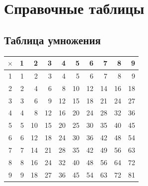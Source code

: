 \chapter*{Справочные таблицы}

\section*{Таблица умножения}

\begingroup\renewcommand{\arraystretch}{1.25}\setlength{\tabcolsep}{6pt}

\begin{center}\begin{tabular}{|c|r|r|r|r|r|r|r|r|r|}\hline

\(\times\)&1&2&3&4&5&6&7&8&9\\\hline

1&1&2&3&4&5&6&7&8&9\\\hline

2&2&4&6&8&10&12&14&16&18\\\hline

3&3&6&9&12&15&18&21&24&27\\\hline

4&4&8&12&16&20&24&28&32&36\\\hline

5&5&10&15&20&25&30&35&40&45\\\hline

6&6&12&18&24&30&36&42&48&54\\\hline

7&7&14&21&28&35&42&49&56&63\\\hline

8&8&16&24&32&40&48&56&64&72\\\hline

9&9&18&27&36&45&54&63&72&81\\\hline

\end{tabular}\end{center}\endgroup

